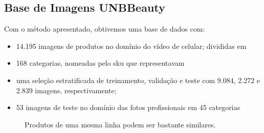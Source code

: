\documentclass[conference]{IEEEtran}
\begin{document}
\subsection{Base de Imagens UNBBeauty}
Com o método apresentado, obtivemos uma base de dados com:
\begin{itemize}
\item 14.195 imagens de produtos no domínio do vídeo de celular; divididas em
\item 168 categorias, nomeadas pelo sku que representavam
\item uma seleção estratificada de treinamento, validação e teste com 9.084, 2.272 e 2.839 imagens, respectivamente;
\item 53 imagens de teste no domínio das fotos profissionais em 45 categorias
\end{itemize}
\begin{figure}
\centering
{}\hfil
{}\hfil
{}
\caption{Produtos de uma mesma linha podem ser bastante similares.}\label{parecidos}
\end{figure}
\end{document}
